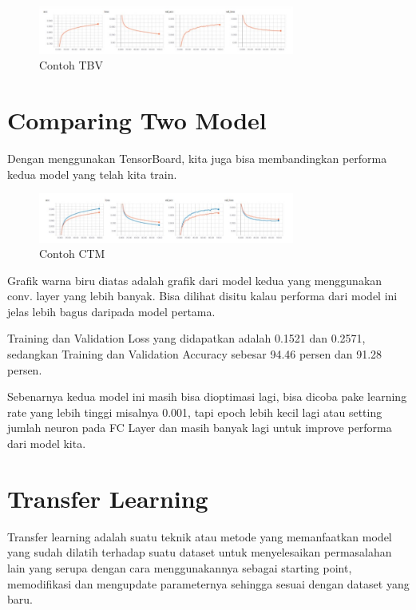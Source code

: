 \begin{figure}[!htp]
	\includegraphics[width=0.75\textwidth]{figures/TensorBoardVisualization.PNG}
	\caption{Contoh TBV}
	\label{labelgambar3}
\end{figure}

\section{Comparing Two Model}
Dengan menggunakan TensorBoard, kita juga bisa membandingkan performa kedua model yang telah kita train.
\begin{figure}[!htp]
	\includegraphics[width=0.75\textwidth]{figures/ComparingTwoModel.PNG}
	\caption{Contoh CTM}
	\label{labelgambar4}
\end{figure}

Grafik warna biru diatas adalah grafik dari model kedua yang menggunakan conv. layer yang lebih banyak. Bisa dilihat disitu kalau performa dari model ini jelas lebih bagus daripada model pertama.

Training dan Validation Loss yang didapatkan adalah 0.1521 dan 0.2571, sedangkan Training dan Validation Accuracy sebesar 94.46 persen dan 91.28 persen.

Sebenarnya kedua model ini masih bisa dioptimasi lagi, bisa dicoba pake learning rate yang lebih tinggi misalnya 0.001, tapi epoch lebih kecil lagi atau setting jumlah neuron pada FC Layer dan masih banyak lagi untuk improve performa dari model kita.




\section{Transfer Learning}
Transfer learning adalah suatu teknik atau metode yang memanfaatkan model yang sudah dilatih terhadap suatu dataset untuk menyelesaikan permasalahan lain yang serupa dengan cara menggunakannya sebagai starting point, memodifikasi dan mengupdate parameternya sehingga sesuai dengan dataset yang baru.

